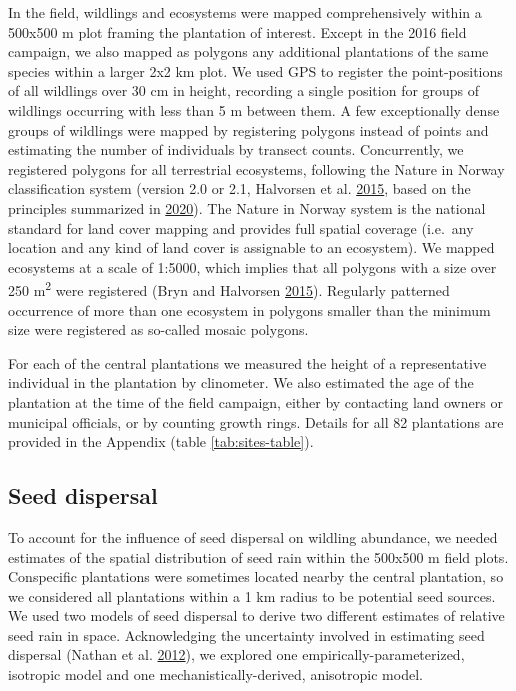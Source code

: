 \documentclass[
]{article}
\begin{document}
In the field, wildlings and ecosystems were mapped comprehensively within a 500x500 m plot framing the plantation of interest.
Except in the 2016 field campaign, we also mapped as polygons any additional plantations of the same species within a larger 2x2 km plot.
We used GPS to register the point-positions of all wildlings over 30 cm in height, recording a single position for groups of wildlings occurring with less than 5 m between them.
A few exceptionally dense groups of wildlings were mapped by registering polygons instead of points and estimating the number of individuals by transect counts.
Concurrently, we registered polygons for all terrestrial ecosystems, following the Nature in Norway classification system (version 2.0 or 2.1, Halvorsen et al. \protect\hyperlink{ref-halvorsenNaturNorgeNiN2015}{2015}, based on the principles summarized in \protect\hyperlink{ref-halvorsenSystematicsEcodiversityEcoSyst2020}{2020}).
The Nature in Norway system is the national standard for land cover mapping and provides full spatial coverage (i.e.~any location and any kind of land cover is assignable to an ecosystem).
We mapped ecosystems at a scale of 1:5000, which implies that all polygons with a size over 250 m\textsuperscript{2} were registered (Bryn and Halvorsen \protect\hyperlink{ref-brynVeilederKartleggingAv2015}{2015}).
Regularly patterned occurrence of more than one ecosystem in polygons smaller than the minimum size were registered as so-called mosaic polygons.

For each of the central plantations we measured the height of a representative individual in the plantation by clinometer.
We also estimated the age of the plantation at the time of the field campaign, either by contacting land owners or municipal officials, or by counting growth rings.
Details for all 82 plantations are provided in the Appendix (table \ref{tab:sites-table}).

\hypertarget{seed-dispersal}{%
\subsection{Seed dispersal}\label{seed-dispersal}}

To account for the influence of seed dispersal on wildling abundance, we needed estimates of the spatial distribution of seed rain within the 500x500 m field plots.
Conspecific plantations were sometimes located nearby the central plantation, so we considered all plantations within a 1 km radius to be potential seed sources.
We used two models of seed dispersal to derive two different estimates of relative seed rain in space.
Acknowledging the uncertainty involved in estimating seed dispersal (Nathan et al. \protect\hyperlink{ref-nathanDispersalKernels2012}{2012}), we explored one empirically-parameterized, isotropic model and one mechanistically-derived, anisotropic model.
\end{document}
